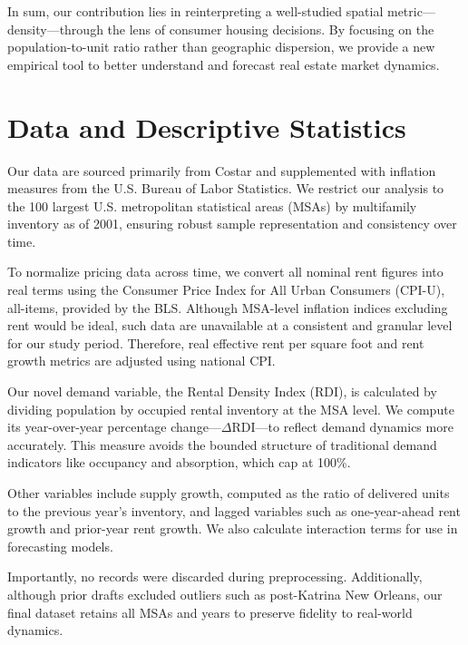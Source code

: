 \documentclass[APA,Times1COL]{WileyNJDv5} %
\begin{document}
In sum, our contribution lies in reinterpreting a well-studied spatial metric---density---through the lens of consumer housing decisions. By focusing on the population-to-unit ratio rather than geographic dispersion, we provide a new empirical tool to better understand and forecast real estate market dynamics.

\section{Data and Descriptive Statistics}\label{sec3}
Our data are sourced primarily from Costar and supplemented with inflation measures from the U.S. Bureau of Labor Statistics. We restrict our analysis to the 100 largest U.S. metropolitan statistical areas (MSAs) by multifamily inventory as of 2001, ensuring robust sample representation and consistency over time.

To normalize pricing data across time, we convert all nominal rent figures into real terms using the Consumer Price Index for All Urban Consumers (CPI-U), all-items, provided by the BLS. Although MSA-level inflation indices excluding rent would be ideal, such data are unavailable at a consistent and granular level for our study period. Therefore, real effective rent per square foot and rent growth metrics are adjusted using national CPI.

Our novel demand variable, the Rental Density Index (RDI), is calculated by dividing population by occupied rental inventory at the MSA level. We compute its year-over-year percentage change---\(\Delta\text{RDI}\)---to reflect demand dynamics more accurately. This measure avoids the bounded structure of traditional demand indicators like occupancy and absorption, which cap at 100\%.

Other variables include supply growth, computed as the ratio of delivered units to the previous year's inventory, and lagged variables such as one-year-ahead rent growth and prior-year rent growth. We also calculate interaction terms for use in forecasting models.

Importantly, no records were discarded during preprocessing. Additionally, although prior drafts excluded outliers such as post-Katrina New Orleans, our final dataset retains all MSAs and years to preserve fidelity to real-world dynamics.
\end{document}
